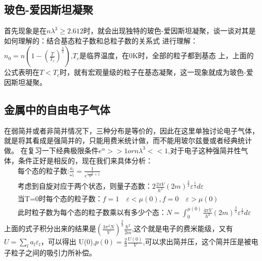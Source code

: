 \documentclass[UTF8]{ctexart}
\begin{document}
\subsection{玻色-爱因斯坦凝聚}
首先现象是在$n\lambda^3\geq 2.612$时，就会出现独特的玻色-爱因斯坦凝聚，谈一谈对其是如何理解的：结合基态粒子数和总粒子数的关系式
进行理解：$n_0=n(1-(\frac{T}{T_c})^\frac{3}{2})$,$T_c$是临界温度，在0K时，全部的粒子都到基态
上，上面的公式表明在$T<T_c$时，就有宏观量级的粒子在基态凝聚，这一现象就成为玻色-爱因斯坦凝聚。
\subsection{金属中的自由电子气体}
在弱简并或者非简并情况下，三种分布是等价的，因此在这里单独讨论电子气体，就是将其看成是强简并的，只能用费米统计做，而不能用玻尔兹曼或者经典统计做。
在复习一下经典极限条件$e^\alpha>>1 or n\lambda^3<<1$,对于电子这种强简并性气体，条件正好是相反的，现在我们来具体分析：
\begin{align*}
         & \text{每个态的粒子数:}\frac{a_l}{\omega_l}=\frac{1}{e^{\frac{\varepsilon-\mu}{kT}+1}}                                                      \\
         & \text{考虑到自旋对应于两个状态，则量子态数：}2 \frac{2\pi V}{h^3}(2m)^{\frac{3}{2}}\varepsilon^\frac{1}{2}d\varepsilon                     \\
         & \text{当T=0时每个态的粒子数：}f=1\quad \varepsilon<\mu(0),f=0 \quad \varepsilon>\mu(0)                                                     \\
         & \text{此时粒子数为每个态的粒子数乘以有多少个态：}N=\int _0^{\mu(0)}\frac{4\pi V}{h^3}(2m)^{\frac{3}{2}}\varepsilon^\frac{1}{2}d\varepsilon
\end{align*}
上面的式子积分出来的结果是$(\frac{3\pi^2N}{V})^\frac{2}{3}\frac{\hbar^2}{2m}$,这个就是电子的费米能级，又有$U=\sum_l a_l \varepsilon_l$，可以得出
U(0),$p(0)=\frac{2}{3}\frac{U(0)}{V}$,可以求出简并压，这个简并压是被电子粒子之间的吸引力所补偿。
\end{document}
